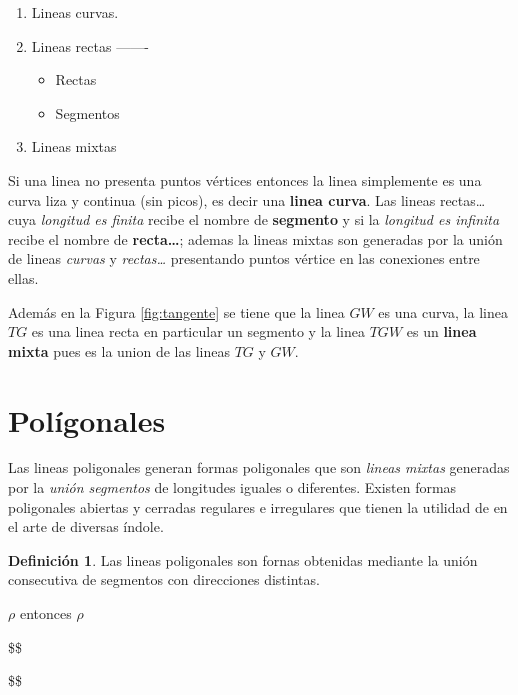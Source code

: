 \documentclass[
  16pt,
]{krantz}
\providecommand{\tightlist}{%
  \setlength{\itemsep}{0pt}\setlength{\parskip}{0pt}}
\theoremstyle{definition}
\newtheorem{definition}{Definición}[chapter]
\theoremstyle{definition}
\theoremstyle{definition}
\theoremstyle{definition}
\theoremstyle{remark}
\begin{document}
\begin{enumerate}
\def\labelenumi{\arabic{enumi}.}
\item
  Lineas curvas.
\item
  Lineas rectas -------

  \begin{itemize}
  \tightlist
  \item
    Rectas
  \item
    Segmentos
  \end{itemize}
\item
  Lineas mixtas
\end{enumerate}

Si una linea no presenta puntos vértices entonces la linea simplemente es una curva liza y continua (sin picos), es decir una \textbf{linea curva}. Las lineas rectas\ldots{} cuya \emph{longitud es finita} recibe el nombre de \textbf{segmento} y si la \emph{longitud es infinita} recibe el nombre de \textbf{recta\ldots{}}; ademas la lineas mixtas son generadas por la unión de lineas \emph{curvas} y \emph{rectas\ldots{}} presentando puntos vértice en las conexiones entre ellas.

Además en la Figura \ref{fig:tangente} se tiene que la linea \(GW\) es una curva, la linea \(TG\) es una linea recta en particular un segmento y la linea \(TGW\) es un \textbf{linea mixta} pues es la union de las lineas \(TG\) y \(GW\).

\hypertarget{poluxedgonales}{%
\section{Polígonales}\label{poluxedgonales}}

Las lineas poligonales generan formas poligonales que son \emph{lineas mixtas} generadas por la \emph{unión segmentos} de longitudes iguales o diferentes. Existen formas poligonales abiertas y cerradas regulares e irregulares que tienen la utilidad de en el arte de diversas índole.

\begin{definition}
\protect\hypertarget{def:poligonal}{}{\label{def:poligonal} }Las lineas poligonales son fornas obtenidas mediante la unión consecutiva de segmentos con direcciones distintas.
\end{definition}

\(\rho\) entonces \(\rho\)

\$\$

\$\$
\end{document}
